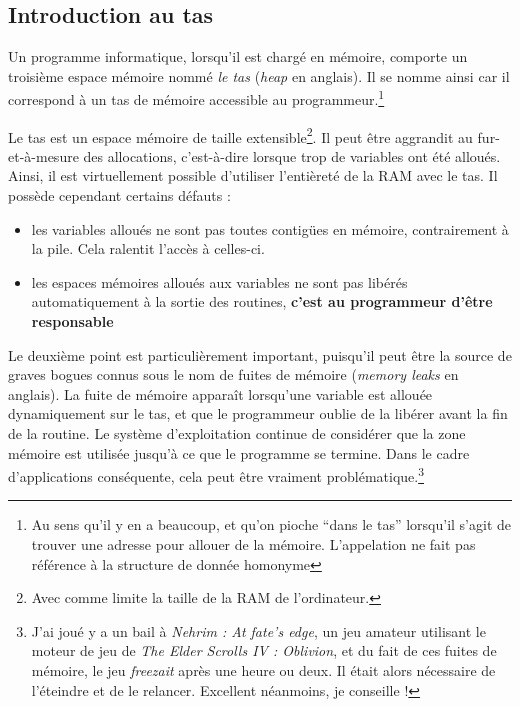 \documentclass[../../../main.tex]{subfiles}
\begin{document}
\subsection{Introduction au tas}
Un programme informatique, lorsqu'il est chargé en mémoire, comporte un troisième espace mémoire nommé \textit{le tas} (\textit{heap} en anglais). Il se nomme ainsi car il correspond à un tas de mémoire accessible au programmeur.\footnote{Au sens qu'il y en a beaucoup, et qu'on pioche ``dans le tas'' lorsqu'il s'agit de trouver une adresse pour allouer de la mémoire. L'appelation ne fait pas référence à la structure de donnée homonyme}
 
Le tas est un espace mémoire de taille extensible\footnote{Avec comme limite la taille de la RAM de l'ordinateur.}. Il peut être aggrandit au fur-et-à-mesure des allocations, c'est-à-dire lorsque trop de variables ont été alloués. Ainsi, il est virtuellement possible d'utiliser l'entièreté de la RAM avec le tas. Il possède cependant certains défauts :
\begin{itemize}
	\item les variables alloués ne sont pas toutes contigües en mémoire, contrairement à la pile. Cela ralentit l'accès à celles-ci.
	\item les espaces mémoires alloués aux variables ne sont pas libérés automatiquement à la sortie des routines, \textbf{c'est au programmeur d'être responsable}
\end{itemize}
Le deuxième point est particulièrement important, puisqu'il peut être la source de graves bogues connus sous le nom de fuites de mémoire (\textit{memory leaks} en anglais). La fuite de mémoire apparaît lorsqu'une variable est allouée dynamiquement sur le tas, et que le programmeur oublie de la libérer avant la fin de la routine. Le système d'exploitation continue de considérer que la zone mémoire est utilisée jusqu'à ce que le programme se termine. Dans le cadre d'applications conséquente, cela peut être vraiment problématique.\footnote{J'ai joué y a un bail à \textit{Nehrim : At fate's edge}, un jeu amateur utilisant le moteur de jeu de \textit{The Elder Scrolls IV : Oblivion}, et du fait de ces fuites de mémoire, le jeu \textit{freezait} après une heure ou deux. Il était alors nécessaire de l'éteindre et de le relancer. Excellent néanmoins, je conseille !}
 
\end{document}
